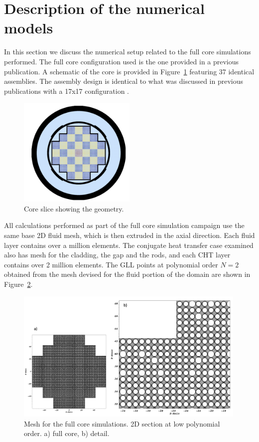 \section{Description of the numerical models}
\label{sec:model}

In this section we discuss the numerical setup related to the full core simulations performed.
The full core configuration used is the one provided in a previous publication. A schematic of the core is provided in Figure~\ref{fig:core} featuring 37 identical assemblies. The assembly design is identical to what was discussed in previous publications with a 17x17 configuration \cite{merzari2020wall}.

\begin{figure}[!ht]
\centering
\includegraphics[width=0.5\textwidth]{./figures/core_slice.png}
\caption{Core slice showing the geometry.}
\label{fig:core}
\end{figure}

All calculations performed as part of the full core simulation campaign use the same base 2D fluid mesh, which is then extruded in the axial direction. Each fluid layer contains over a million elements. The conjugate heat transfer case examined also has mesh for the cladding, the gap and the rods, and each CHT layer contains over 2 million elements. The GLL points at polynomial order $N=2$ obtained from the mesh devised for the fluid portion of the domain are shown in Figure~\ref{fig:mesh1}.

\begin{figure}[!ht]
\centering
\includegraphics[width=0.99\textwidth]{./figures/full_core_mesh.png}
\caption{Mesh for the full core simulations. 2D section at low polynomial order. a) full core, b) detail.}
\label{fig:mesh1}
\end{figure}

